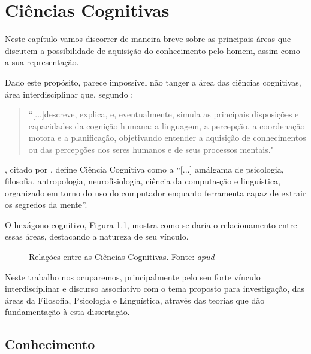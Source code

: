 \chapter{\hspace*{3pt} Ciências Cognitivas}
\label{chap:cienciaCognitiva}

Neste capítulo vamos discorrer de maneira breve sobre as principais áreas que discutem a possibilidade de aquisição do conhecimento pelo homem, assim como a sua representação. 

Dado este propósito, parece impossível não tanger a área das ciências cognitivas, área interdisciplinar que, segundo :

\begin{quote}
``[...]descreve, explica, e, eventualmente, simula as principais disposições e capacidades da cognição humana: a linguagem, a percepção, a coordenação motora e a planificação, objetivando entender a aquisição de conhecimentos ou das percepções dos seres humanos e de seus processos mentais." \cite[p.60]{lacerda:2012.linguagem}
\end{quote}

, citado por , define Ciência Cognitiva como a ``[...] amálgama de psicologia, filosofia, antropologia, neurofisiologia, ciência da computa-ção e linguística, organizado em torno do uso do computador enquanto ferramenta capaz de extrair os segredos da mente”.

O hexágono cognitivo, Figura \ref{fig:hexagono_cognitivo}, mostra como se daria o relacionamento entre essas áreas, destacando a natureza de seu vínculo. \cite{lacerda:2012.linguagem}

\begin{figure}
    \centering
    \caption{Relações entre as Ciências Cognitivas. Fonte: \cite{gardner:1995.nova} \textit{apud} \cite{lima:2003.interfaces}}
    \label{fig:hexagono_cognitivo}
\end{figure}

Neste trabalho nos ocuparemos, principalmente pelo seu forte vínculo interdisciplinar e discurso associativo com o tema proposto para investigação, das áreas da Filosofia, Psicologia e Linguística, através das teorias que dão fundamentação à esta dissertação.

\section{\hspace*{3pt} Conhecimento}

